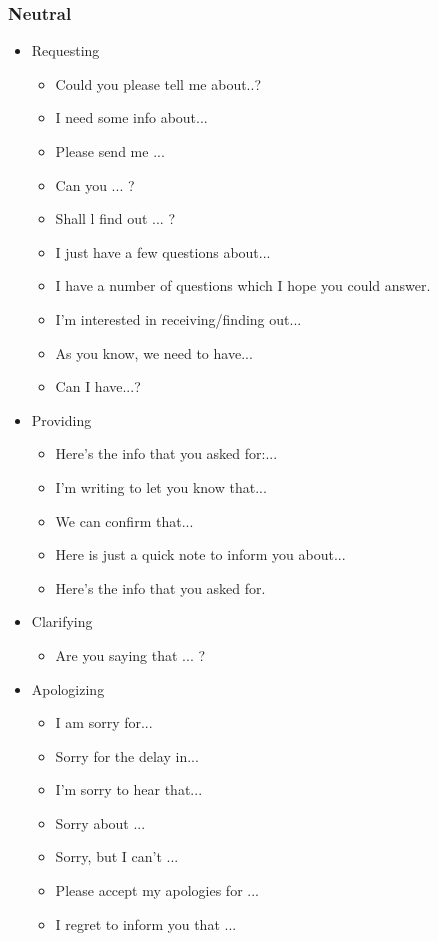 \subsubsection{Neutral}
\begin{itemize}
\item Requesting
	\begin{itemize}
	\item Could you please tell me about..?
	\item I need some info about...
	\item Please send me ...
	\item Can you ... ?
	\item Shall l find out ... ?
	\item I just have a few questions about...
	\item I have a number of questions which I hope you could answer.
	\item I'm interested in receiving/finding out...
	\item As you know, we need to have...
	\item Can I have...?
	\end{itemize}
\item Providing
	\begin{itemize}
	\item Here's the info that you asked for:...
	\item I'm writing to let you know that...
	\item We can confirm that...
	\item Here is just a quick note to inform you about...
	\item Here's the info that you asked for.
	\end{itemize}
\item Clarifying
	\begin{itemize}
	\item Are you saying that ... ?
	\end{itemize}
\item Apologizing
	\begin{itemize}
	\item I am sorry for...
	\item Sorry for the delay in...
	\item I'm sorry to hear that...
	\item Sorry about ...
	\item Sorry, but I can't ...
	\item Please accept my apologies for ...
	\item I regret to inform you that ...

\end{itemize}
\end{itemize}
